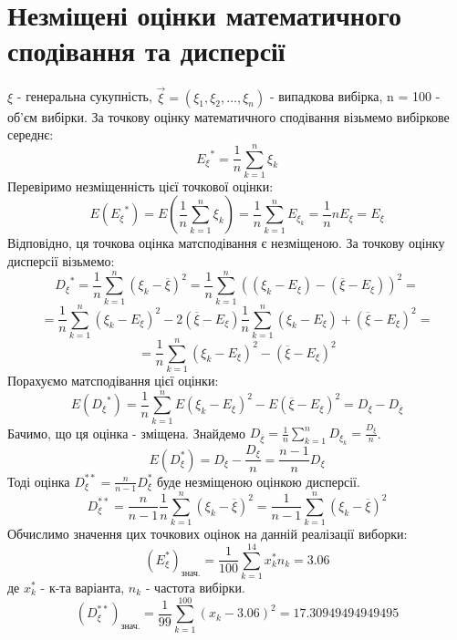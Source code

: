 \documentclass{article}
\begin{document}
\section{Незміщені оцінки математичного сподівання та дисперсії}
$\xi$ - генеральна сукупність, $\vec{\xi} = 
(\xi_1, \xi_2, \dots, \xi_{n})$ - випадкова вибірка, 
n = 100 - об’єм вибірки.  
\newline
За точкову оцінку математичного сподівання візьмемо вибіркове середнє:
$${E_\xi}^* = \frac{1}{n} \sum_{k=1}^{n}\xi_k$$
Перевіримо незміщенність цієї точкової оцінки:
\begin{equation}\label{bias}
  E({E_\xi}^*) = E(\frac{1}{n} \sum_{k=1}^{n}\xi_k) = 
  \frac{1}{n} \sum_{k=1}^{n}E_{\xi_k} = \frac{1}{n}nE_{\xi} 
  = E_\xi
\end{equation}
Відповідно, ця точкова оцінка матсподівання є незміщеною.
\newline
За точкову оцінку дисперсії візьмемо:
$$ {D_{\xi}}^{*} = \frac{1}{n} \sum_{k=1}^n 
(\xi_k - \overline{\xi})^2 = \frac{1}{n}\sum_{k=1}^n
((\xi_k - E_\xi) - (\overline{\xi} - E_\xi))^2 = $$
$$= \frac{1}{n} \sum_{k = 1}^n(\xi_k - E_\xi)^2 - 2(\overline{\xi} 
- E_\xi)\frac{1}{n}\sum_{k=1}^n(\xi_k - E_\xi) + (\overline{\xi} 
- E_\xi)^2 = $$
$$= \frac{1}{n} \sum_{k = 1}^n (\xi_k - E_\xi)^2 - (\overline{\xi} 
- E_\xi)^2$$
Порахуємо матсподівання цієї оцінки:
$$E({D_{\xi}}^{*}) = \frac{1}{n}\sum_{k=1}^n E(\xi_k - E_\xi)^2 
- E(\overline{\xi} - E_\xi)^2 = D_\xi - D_{\overline{\xi}}$$
Бачимо, що ця оцінка - зміщена.
Знайдемо $D_{\overline{\xi}} = \frac{1}{n}\sum_{k=1}^n D_{\xi_k} = 
\frac{D_{\xi}}{n}$.
$$E(D_\xi^*) = D_\xi - \frac{D_\xi}{n} = \frac{n-1}{n}D_\xi$$
Тоді оцінка $D^{**}_\xi = \frac{n}{n-1}D_\xi^*$ буде незміщеною 
оцінкою дисперсії.
$$D^{**}_\xi = \frac{n}{n-1} \frac{1}{n} \sum_{k=1}^n 
(\xi_k - \overline{\xi})^2 = \frac{1}{n - 1} \sum_{k=1}^n 
(\xi_k - \overline{\xi})^2$$
Обчислимо значення цих точкових оцінок на данній реалізації виборки:
$$(E^*_{\xi})_{\text{знач.}} = \frac{1}{100} 
\sum_{k = 1}^{14} x_k^* n_k = 3.06$$
де $x_k^*$ - к-та варіанта, $n_k$ - частота вибірки.
$$(D^{**}_\xi)_\text{знач.} = \frac{1}{99} \sum_{k = 1}^{100}
(x_k - 3.06)^2 = 17.30949494949495$$
\newpage
\end{document}

